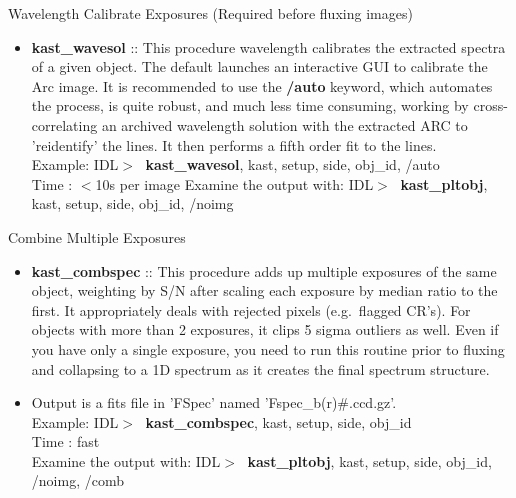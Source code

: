 \documentclass[11pt,letterpaper,dvips]{article}
\begin{document}
\begin{enumerate}
{\Large  \item Wavelength Calibrate Exposures (Required before fluxing images)} 
  \begin{itemize}
	\item {\bf kast\_wavesol} ::
	This procedure wavelength calibrates the extracted spectra of a given 
	object.  The default launches an interactive GUI to calibrate the 
	Arc image.  It is recommended to use the {\bf /auto} keyword, which 
	automates the process, is quite robust, and much less time consuming,  
	working by cross-correlating an archived wavelength solution with the 
	extracted ARC to 'reidentify' the lines.  It then performs a 
	fifth order fit to the lines. \\
         \quad Example: IDL$> \;$ {\bf kast\_wavesol}, kast, setup, side, obj\_id, /auto \\
         \quad Time   : $<$10s per image
         \quad Examine the output with:  
	    IDL$> \;$ {\bf kast\_pltobj}, kast, setup, side, obj\_id, /noimg \\
  \end{itemize}

{\Large  \item Combine Multiple Exposures }
  \begin{itemize}
	\item {\bf kast\_combspec} ::
	This procedure adds up multiple exposures of the same object,
	weighting by S/N after scaling each exposure by median ratio to the
	first.  It appropriately deals with rejected
	pixels (e.g.\ flagged CR's).  For objects
	with more than 2 exposures, it clips 5 sigma outliers as well.  Even
	if you have only a single exposure, you need to run this routine prior
	to fluxing and collapsing to a 1D spectrum as it creates the final
	spectrum structure. \\
	\item Output is a fits file in 'FSpec' named 'Fspec\_b(r)\#.ccd.gz'. \\
         \quad Example: IDL$> \;$ {\bf kast\_combspec}, kast, setup, side, obj\_id \\
         \quad Time   : fast \\
         \quad Examine the output with:  
	    IDL$> \;$ {\bf kast\_pltobj}, kast, setup, side, obj\_id, /noimg, /comb \\
  \end{itemize}


\end{enumerate}
\end{document}
